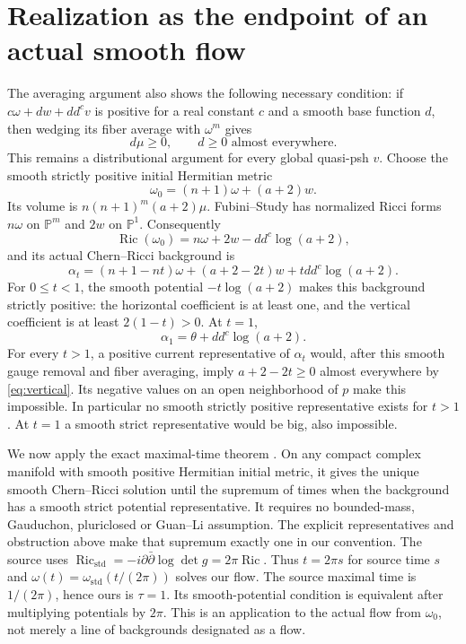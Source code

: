 \documentclass[11pt]{article}
\newcommand{\ddc}{dd^c}
\theoremstyle{remark}\newtheorem{remark}[theorem]{Remark}
\begin{document}
\section{Realization as the endpoint of an actual smooth flow}
The averaging argument also shows the following necessary condition:
if $c\omega+d w+\ddc v$ is positive for a real constant $c$ and a smooth
base function $d$, then wedging its fiber average with $\omega^m$ gives
\begin{equation}\label{eq:vertical}
 d\mu\geq0,\qquad d\geq0\text{ almost everywhere}.
\end{equation}
This remains a distributional argument for every global quasi-psh $v$.
Choose the smooth strictly positive initial Hermitian metric
\[
 \omega_0=(n+1)\omega+(a+2)w.
\]
Its volume is $n(n+1)^m(a+2)\mu$. Fubini--Study has normalized Ricci
forms $n\omega$ on $\mathbb P^m$ and $2w$ on $\mathbb P^1$.
Consequently
\[
 \operatorname{Ric}(\omega_0)=n\omega+2w-\ddc\log(a+2),
\]
and its actual Chern--Ricci background is
\begin{equation}\label{eq:background}
 \alpha_t=(n+1-nt)\omega+(a+2-2t)w+t\ddc\log(a+2).
\end{equation}
For $0\leq t<1$, the smooth potential $-t\log(a+2)$ makes this
background strictly positive: the horizontal coefficient is at least one,
and the vertical coefficient is at least $2(1-t)>0$.
At $t=1$,
\begin{equation}\label{eq:endpoint}
 \alpha_1=\theta+\ddc\log(a+2).
\end{equation}
For every $t>1$, a positive current representative of $\alpha_t$ would,
after this smooth gauge removal and fiber averaging, imply
$a+2-2t\geq0$ almost everywhere by \eqref{eq:vertical}.
Its negative values on an open neighborhood of $p$ make this impossible.
In particular no smooth strictly positive representative exists for $t>1$.
At $t=1$ a smooth strict representative would be big, also impossible.

We now apply the exact maximal-time theorem \cite[Theorem 1.2]{TW}.
On any compact complex manifold with smooth positive Hermitian initial
metric, it gives the unique smooth Chern--Ricci solution until the
supremum of times when the background has a smooth strict potential
representative. It requires no bounded-mass, Gauduchon, pluriclosed or
Guan--Li assumption. The explicit representatives and obstruction above
make that supremum exactly one in our convention.
The source uses $\operatorname{Ric}_{\mathrm{std}}
=-i\partial\bar\partial\log\det g=2\pi\operatorname{Ric}$.
Thus $t=2\pi s$ for source time $s$ and
$\omega(t)=\omega_{\mathrm{std}}(t/(2\pi))$ solves our flow.
The source maximal time is $1/(2\pi)$, hence ours is $\tau=1$.
Its smooth-potential condition is equivalent after multiplying potentials
by $2\pi$. This is an application to the actual flow from $\omega_0$,
not merely a line of backgrounds designated as a flow.
\end{document}
